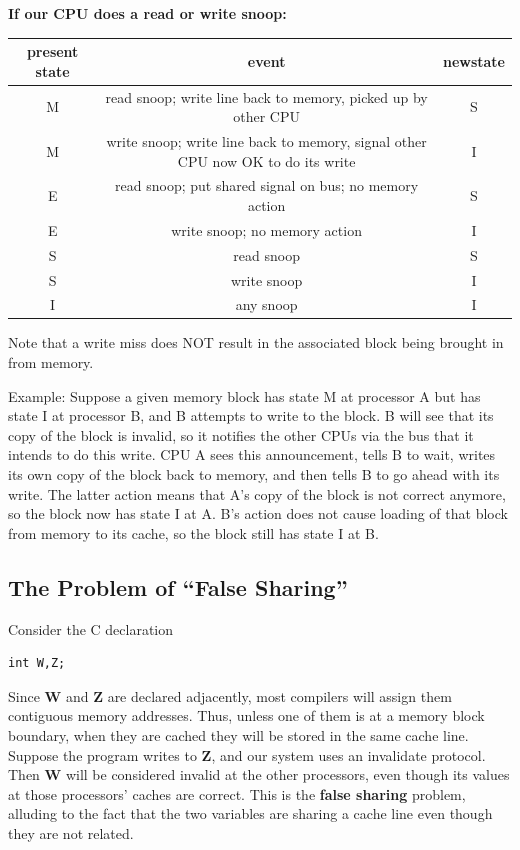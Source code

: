 \par{} \vspace{0.3cm}

{\bf If our CPU does a read or write snoop:}

\begin{tabular}{|c|c|c|}
\hline
present state&
 event&
 newstate\\
\hline
M&
 read snoop; write line back to memory, picked up by other CPU&
 S\\
\hline
M&
 write snoop; write line back to memory, signal other CPU now OK to do its
 write&
 I\\
\hline
E&
 read snoop; put shared signal on bus; no memory action&
 S\\
\hline
E&
 write snoop; no memory action&
 I\\
\hline
S&
 read snoop&
 S\\
\hline
S&
 write snoop&
 I\\
\hline
I&
 any snoop&
 I \\
\hline
\end{tabular}

Note that a write miss does NOT result in the associated block being
brought in from memory.

Example:  Suppose a given memory block has state M at processor A but
has state I at processor B, and B attempts to write to the block.  B
will see that its copy of the block is invalid, so it notifies the other
CPUs via the bus that it intends to do this write.  CPU A sees this
announcement, tells B to wait, writes its own copy of the block
back to memory, and then tells B to go ahead with its write.  The
latter action means that A's copy of the block is not correct anymore,
so the block now has state I at A.  B's action does not cause loading of
that block from memory to its cache, so the block still has state I at
B.

\par{} \vspace{0.3cm}

\subsection{The Problem of ``False Sharing''}

Consider the C declaration

\begin{Verbatim}[fontsize=\relsize{-2}]
int W,Z;
\end{Verbatim}

Since {\bf W} and {\bf Z} are declared adjacently, most compilers will
assign them contiguous memory addresses.  Thus, unless one of them is at
a memory block boundary, when they are cached they will be stored in the
same cache line.  Suppose the program writes to {\bf Z}, and our system
uses an invalidate protocol.  Then {\bf W} will be considered invalid at
the other processors, even though its values at those processors' caches
are correct.  This is the {\bf false sharing} problem, alluding to the
fact that the two variables are sharing a cache line even though they
are not related.


